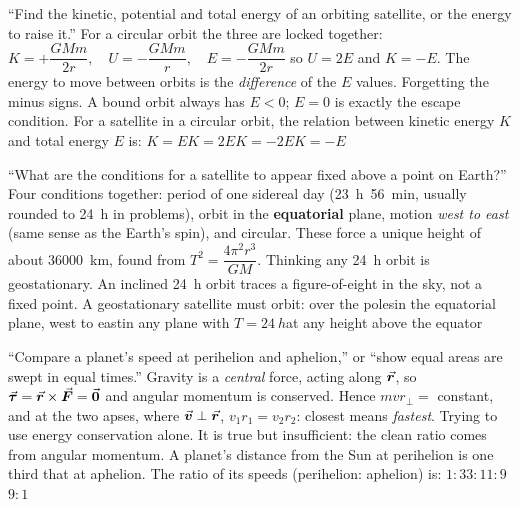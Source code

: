 {``Find the kinetic, potential and total energy of an orbiting satellite, or the energy to raise it.''}
{For a circular orbit the three are locked together:
$\boxed{K=+\dfrac{GMm}{2r},\quad U=-\dfrac{GMm}{r},\quad E=-\dfrac{GMm}{2r}}$
so $U=2E$ and $K=-E$. The energy to move between orbits is the \emph{difference} of the $E$ values.}
{Forgetting the minus signs. A bound orbit always has $E<0$; $E=0$ is exactly the escape condition.}
{For a satellite in a circular orbit, the relation between kinetic energy $K$ and total energy $E$ is:}
{$K=E$}{$K=2E$}{$K=-2E$}{$K=-E$}

{``What are the conditions for a satellite to appear fixed above a point on Earth?''}
{Four conditions together: period of one sidereal day (\SI{23}{h}~\SI{56}{min}, usually rounded to
\SI{24}{h} in problems), orbit in the \textbf{equatorial} plane, motion \emph{west to east} (same sense as the Earth's spin), and circular. These force a unique
height of about \SI{36000}{km}, found from $T^2=\dfrac{4\pi^2r^3}{GM}$.}
{Thinking any \SI{24}{h} orbit is geostationary. An inclined \SI{24}{h} orbit traces a figure-of-eight in
the sky, not a fixed point.}
{A geostationary satellite must orbit:}
{over the poles}{in the equatorial plane, west to east}{in any plane with $T=\SI{24}{h}$}{at any height
above the equator}

{``Compare a planet's speed at perihelion and aphelion,'' or ``show equal areas are swept in equal
times.''}
{Gravity is a \emph{central} force, acting along $\vec{\bm{r}}$, so $\vec{\bm{\tau}}=\vec{\bm{r}}\times\vec{\bm{F}}=\vec{\bm{0}}$ and angular momentum is
conserved. Hence $mvr_\perp=$ constant, and at the two apses, where $\vec{\bm{v}}\perp\vec{\bm{r}}$,
$\boxed{v_1r_1=v_2r_2}$: closest means \emph{fastest}.}
{Trying to use energy conservation alone. It is true but insufficient: the clean ratio comes from
angular momentum.}
{A planet's distance from the Sun at perihelion is one third that at aphelion. The ratio of its speeds
(perihelion: aphelion) is:}
{$1:3$}{$3:1$}{$1:9$}{$9:1$}

